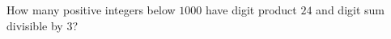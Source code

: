How many positive integers below $ 1000 $ have digit product $ 24 $ and digit sum divisible by $ 3 $?
